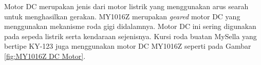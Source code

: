 Motor DC merupakan jenis dari motor listrik yang menggunakan arus searah untuk menghasilkan gerakan. MY1016Z merupakan \emph{geared} motor DC yang menggunakan mekanisme roda gigi didalamnya. Motor DC ini sering digunakan pada sepeda listrik serta kendaraan sejenisnya. Kursi roda buatan MySella yang bertipe KY-123 juga menggunakan motor DC MY1016Z seperti pada Gambar \ref{fig:MY1016Z DC Motor}.
